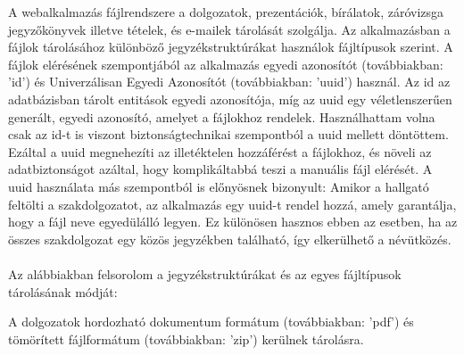 


A webalkalmazás fájlrendszere a dolgozatok, prezentációk, bírálatok, záróvizsga jegyzőkönyvek illetve tételek, és e-mailek tárolását szolgálja. Az alkalmazásban a fájlok tárolásához különböző jegyzékstruktúrákat használok  fájltípusok szerint. A fájlok elérésének szempontjából az alkalmazás egyedi azonosítót (továbbiakban: 'id') és Univerzálisan Egyedi Azonosítót (továbbiakban: 'uuid') használ. Az id az adatbázisban tárolt entitások egyedi azonosítója, míg az uuid egy véletlenszerűen generált, egyedi azonosító, amelyet a fájlokhoz rendelek. Használhattam volna csak az id-t is viszont biztonságtechnikai szempontból a uuid mellett döntöttem. Ezáltal a uuid megnehezíti az illetéktelen hozzáférést a fájlokhoz, és növeli az adatbiztonságot azáltal, hogy komplikáltabbá teszi a manuális fájl elérését. A uuid használata más szempontból is előnyösnek bizonyult: Amikor a hallgató feltölti a szakdolgozatot, az alkalmazás egy uuid-t rendel hozzá, amely garantálja, hogy a fájl neve egyedülálló legyen. Ez különösen hasznos ebben az esetben, ha az összes szakdolgozat egy közös jegyzékben található, így elkerülhető a névütközés.\\
\\
Az alábbiakban felsorolom a jegyzékstruktúrákat és az egyes fájltípusok tárolásának módját:

A dolgozatok hordozható dokumentum formátum (továbbiakban: 'pdf') és tömörített fájlformátum (továbbiakban: 'zip') kerülnek tárolásra.

